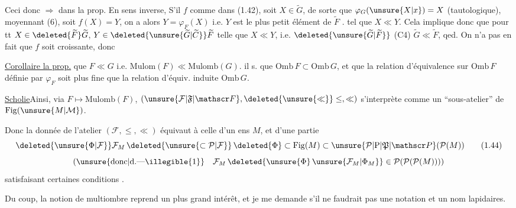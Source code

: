 Ceci  donc $\Rightarrow$ dans la prop.
En sens inverse, S'il  $f$ comme dans (1.42), soit $X\in\widetilde G$,   de sorte que $\varphi_G(\unsure{X|x})=X$ (tautologique), moyennant (6),  soit $f(X)=Y$, on a alors $Y=\varphi_F(X)$ i.e. $Y$ est le plus petit élément de $\widetilde F$ .  tel que $X\ll Y$. Cela  implique donc que pour tt $X\in\deleted{\widetilde F}\widetilde G$,  $Y\in\deleted{\unsure{\widetilde G|\widetilde C}}\widetilde F$ telle que $X\ll Y$, i.e. $\deleted{\unsure{\widetilde G|\widetilde F}}$ (C4) $\widetilde G\ll\widetilde F$, qed. On n'a pas  en fait que $f$ soit croissante, donc

\uline{Corollaire  la prop.}\quad {}  que $F\ll G$ i.e. $\mathrm{Mulom}(F)\ll\mathrm{Mulomb}(G)$. il s. que $\mathrm{Omb}\,F\subset\mathrm{Omb}\,G$,
et que  la relation d'équivalence  sur $\mathrm{Omb}\,F$ définie par $\varphi_F$ soit plus fine que la relation d'équiv. induite  $\mathrm{Omb}\,G$.

\uline{Scholie}\quad Ainsi, via $F\longmapsto\mathrm{Mulomb}(F)$,
$(\unsure{\mathcal F|\mathfrak F|\mathscr F},\deleted{\unsure{\ll}}\leq,\ll)$ s'interprète comme un ``sous-atelier'' de $\mathrm{Fig}(\unsure{M|\mathcal M})$.

Donc la donnée de l'atelier $(\mathcal F,\leq,\ll)$ équivaut à celle d'un ens $M$, et d'une partie
\[
 \deleted{\unsure{\Phi|\mathcal F}}\mathcal F_M\,
 \deleted{\unsure{\subset\mathcal P|\mathcal F}}\,
 \deleted{\Phi}\subset\mathrm{Fig}(M)\subset
 \unsure{\mathcal P|\mathrm P|\mathfrak P|\mathscr P}(\mathcal P(M))
 \tag*{(1.44)}
\]
\[
 \left(\text{\unsure{donc|d.---\illegible{1}}}\quad
 \mathcal F_M\,\deleted{\unsure{\Phi}\,\unsure{\mathcal F_M|\Phi_M}}
 \in\mathcal P(\mathcal P(\mathcal P(M)))\right)
\]
satisfaisant certaines conditions .

Du coup, la notion de  multiombre reprend un plus grand intérêt, et je me demande s'il ne faudrait pas une notation  et un nom  lapidaires.

